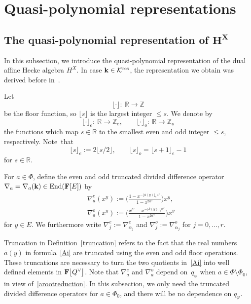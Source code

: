 \section{Quasi-polynomial representations}\label{qpsect}

\subsection[The quasi-polynomial representation of H\^{}X]{The quasi-polynomial representation of $\boldsymbol{H^X}$}\label{qpHX}

In this subsection, we introduce the quasi-polynomial representation of the dual affine Hecke algebra $H^X$.
In case $\mathbf{k}\in\mathcal{K}^{{\rm res}}$,
the representation we obtain was derived before in~\cite{SSV2, SSV1}.

Let
\[
\lfloor\cdot\rfloor\colon \ \mathbb{R}\rightarrow \mathbb{Z}
\]
be the floor function, so $\lfloor s\rfloor$ is the largest integer $\leq s$. We denote by
\[
\lfloor\cdot\rfloor_e\colon \ \mathbb{R}\rightarrow\mathbb{Z}_e,\qquad
\lfloor\cdot\rfloor_o\colon \ \mathbb{R}\rightarrow\mathbb{Z}_o
\]
the functions which map $s\in\mathbb{R}$ to
the smallest even and odd integer $\leq s$, respectively. Note~that
\[
\lfloor s\rfloor_e:=2\lfloor s/2\rfloor,\qquad
\lfloor s\rfloor_o=\lfloor s+1\rfloor_e-1
\]
for $s\in\mathbb{R}$.

\begin{Definition}\label{truncation}
For $a\in\Phi$, define the even and odd truncated divided difference operator $\nabla_a=\nabla_a(\mathbf{k})\in\textup{End}(\mathbf{F}[E])$ by
\begin{align}
&\nabla_a^e(x^y):=\Biggl(\frac{1-x^{-\lfloor\overline{a}(y)\rfloor_ea^\vee}}{1-x^{2a^\vee}}\Biggr)x^y,\nonumber\\
&\nabla_a^o(x^y):=\Biggl(\frac{x^{a^\vee}-x^{-\lfloor\overline{a}(y)\rfloor_oa^\vee}}{1-x^{2a^\vee}}\Biggr)x^y\label{Ai}
\end{align}
for $y\in E$. We furthermore write $\nabla_j^e:=\nabla_{\alpha_j}^e$ and $\nabla_j^o:=\nabla_{\alpha_j}^o$ for $j=0,\dots,r$.
\end{Definition}

Truncation in Definition~\ref{truncation} refers to the fact that the real numbers $\overline{a}(y)$ in formula~\eqref{Ai} are truncated using the even and odd floor operations.
These truncations are necessary to turn the two quotients in~\eqref{Ai} into well defined elements in $\mathbf{F}\smash{\bigl[Q^\vee\bigr]}$. Note that $\nabla_a^e$ and $\nabla_a^o$ depend on~$q_\varphi$ when $a\in\Phi\setminus\Phi_0$, in view of~\eqref{arootreduction}. In this subsection, we only need the truncated divided difference operators for $a\in\Phi_0$, and there will be no dependence on $q_\varphi$.

